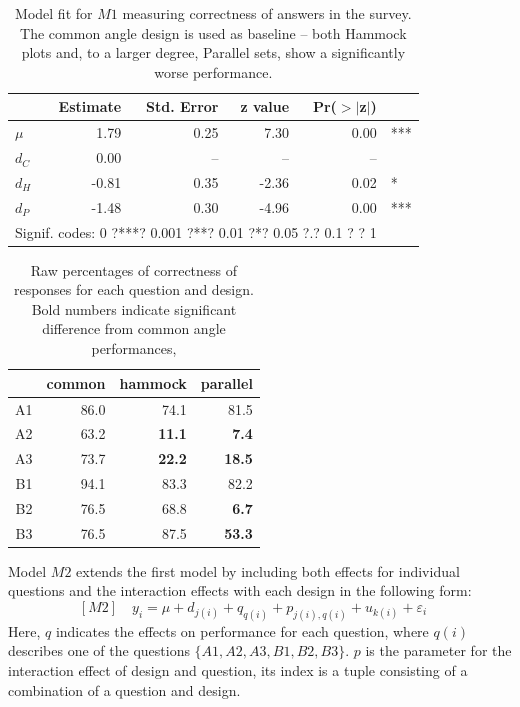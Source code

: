 \begin{table}[ht]
\begin{center}
\begin{tabular}{lrrrrl}
  \hline
 & Estimate & Std. Error & z value & Pr($>$$|$z$|$) & \\ 
  \hline
$\mu$ & 1.79 & 0.25 & 7.30 & 0.00 & ***\\ [5pt]
  $d_C$& 0.00 & -- & -- & -- \\ 
  $d_H$ & -0.81 & 0.35 & -2.36 & 0.02 & * \\ 
  $d_P$ & -1.48 & 0.30 & -4.96 & 0.00 & ***\\ 
   \hline
\multicolumn{5}{l}{Signif. codes:  0 ?***? 0.001 ?**? 0.01 ?*? 0.05 ?.? 0.1 ? ? 1 }
\end{tabular}
\end{center}
\caption{\label{coef1} Model fit for $M1$ measuring correctness of answers in the survey. The common angle design is used as baseline -- both Hammock plots and, to a larger degree, Parallel sets, show a significantly worse performance.}
\end{table}


\begin{table}[ht]
\begin{center}
\begin{tabular}{rrrr}
  \hline
 & common & hammock & parallel \\ 
  \hline
A1 & 86.0 & 74.1 & 81.5 \\ 
  A2 & 63.2 & {\bf 11.1} & {\bf 7.4} \\ 
  A3 & 73.7 & {\bf 22.2} & {\bf 18.5} \\ 
  B1 & 94.1 & 83.3 & 82.2 \\ 
  B2 & 76.5 & 68.8 & {\bf 6.7} \\ 
  B3 & 76.5 & 87.5 & {\bf 53.3} \\ 
   \hline
\end{tabular}
\end{center}
\caption{\label{raw} Raw percentages of correctness of responses for each question and design. Bold numbers indicate significant difference from common angle performances,}
\end{table}

Model $M2$ extends the first model by including both  effects for individual questions and the interaction effects with each design in the following form:
\begin{equation}\label{model2}[M2]
\quad y_i = \mu + d_{j(i)}  + q_{q(i)} + p_{j(i),q(i)} + u_{k(i)} + \varepsilon_i \quad
\end{equation}
Here, $q$ indicates the effects on performance for  each question, where $q(i)$ describes one of the questions $\{A1, A2, A3, B1, B2, B3\}$. $p$ is the parameter for the interaction effect of design and question, its index is a tuple consisting of a combination of a question and design. 

